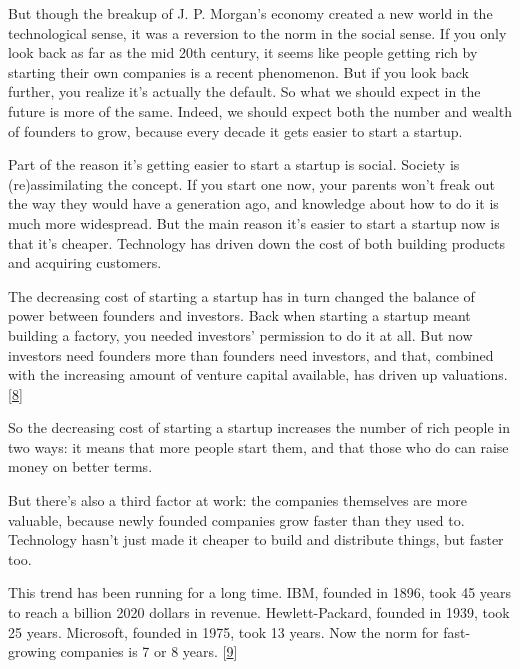 But though the breakup of J. P. Morgan's economy
                  created a new world in the technological sense, it was a
                  reversion to the norm in the social sense. If you only look
                  back as far as the mid 20th century, it seems like people
                  getting rich by starting their own companies is a recent
                  phenomenon. But if you look back further, you realize it's
                  actually the default. So what we should expect in the future
                  is more of the same. Indeed, we should expect both the number
                  and wealth of founders to grow, because every decade it gets
                  easier to start a startup.

Part of the reason it's
                  getting easier to start a startup is social. Society is
                  (re)assimilating the concept. If you start one now, your
                  parents won't freak out the way they would have a generation
                  ago, and knowledge about how to do it is much more widespread.
                  But the main reason it's easier to start a startup now is that
                  it's cheaper. Technology has driven down the cost of both
                  building products and acquiring customers.

The
                  decreasing cost of starting a startup has in turn changed the
                  balance of power between founders and investors. Back when
                  starting a startup meant building a factory, you needed
                  investors' permission to do it at all. But now investors need
                  founders more than founders need investors, and that, combined
                  with the increasing amount of venture capital available, has
                  driven up valuations.
                  [\href{\#f8n}{8}]

So the decreasing cost of starting a startup
                  increases the number of rich people in two ways: it means that
                  more people start them, and that those who do can raise money
                  on better terms.

But there's also a third factor at
                  work: the companies themselves are more valuable, because
                  newly founded companies grow faster than they used to.
                  Technology hasn't just made it cheaper to build and distribute
                  things, but faster too.

This trend has been running
                  for a long time. IBM, founded in 1896, took 45 years to reach
                  a billion 2020 dollars in revenue. Hewlett-Packard, founded in
                  1939, took 25 years. Microsoft, founded in 1975, took 13
                  years. Now the norm for fast-growing companies is 7 or 8
                  years.
                  [\href{\#f9n}{9}]

